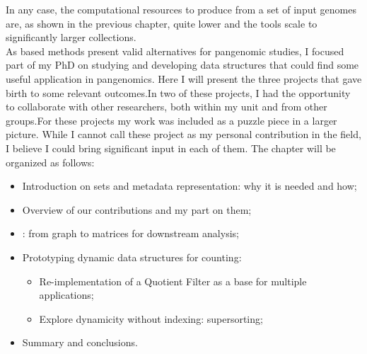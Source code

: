 In any case, the computational resources to produce \ccdbg from a set of input genomes are, as shown in the previous chapter, quite lower and the tools scale to significantly larger collections.\\
As \kmer based methods present valid alternatives for pangenomic studies, I focused part of my PhD on studying and developing data structures that could find some useful application in pangenomics. Here I will present the three projects that gave birth to some relevant outcomes.In two of these projects, I had the opportunity to collaborate with other researchers, both within my unit and from other groups.For these projects my work was included as a puzzle piece in a larger picture. While I cannot call these project as my personal contribution in the field, I believe I could bring significant input in each of them.
The chapter will be organized as follows:
\begin{itemize}
	\item Introduction on \kmer sets and metadata representation: why it is needed and how;
	\item Overview of our contributions and my part on them;
	\item \muset: from graph to matrices for downstream analysis;
	\item Prototyping dynamic data structures for \kmer counting:
	\begin{itemize}
		\item Re-implementation of a Quotient Filter as a base for multiple applications;
		\item Explore dynamicity without indexing: super\kmer sorting;
	\end{itemize}
	\item Summary and conclusions.
\end{itemize}
